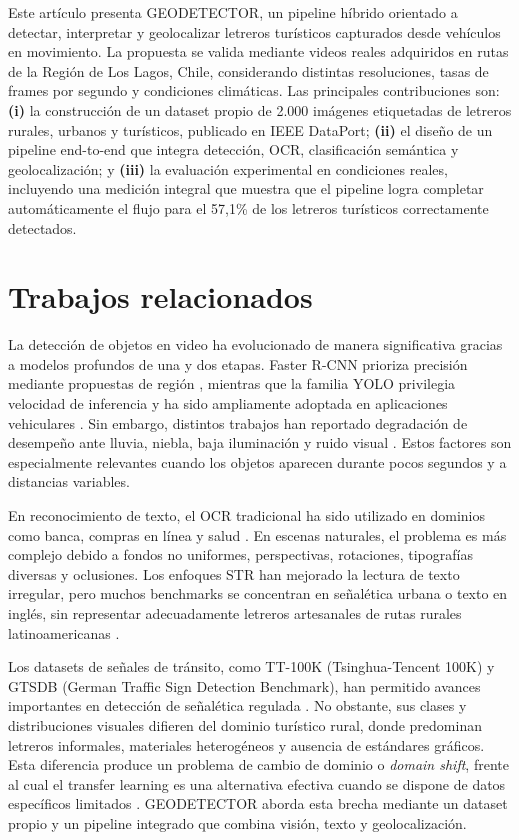 \documentclass[conference]{IEEEtran}
\begin{document}
Este artículo presenta GEODETECTOR, un pipeline híbrido orientado a 
detectar, interpretar y geolocalizar letreros turísticos capturados 
desde vehículos en movimiento. La propuesta se valida mediante videos 
reales adquiridos en rutas de la Región de Los Lagos, Chile, considerando
distintas resoluciones, tasas de frames por segundo y condiciones 
climáticas. Las principales contribuciones son: \textbf{(i)} la 
construcción de un dataset propio de 2.000 imágenes etiquetadas de 
letreros rurales, urbanos y turísticos, publicado en IEEE DataPort; 
\textbf{(ii)} el diseño de un pipeline end-to-end que integra detección, 
OCR, clasificación semántica y geolocalización; y \textbf{(iii)} la evaluación 
experimental en condiciones reales, incluyendo una medición integral 
que muestra que el pipeline logra completar automáticamente el flujo 
para el 57,1\% de los letreros turísticos correctamente detectados.

\section{Trabajos relacionados}

La detección de objetos en video ha evolucionado de manera significativa 
gracias a modelos profundos de una y dos etapas. Faster R-CNN prioriza
precisión mediante propuestas de región \cite{rnn-faster}, mientras que 
la familia YOLO privilegia velocidad de inferencia y ha sido ampliamente 
adoptada en aplicaciones vehiculares \cite{comparacion-yolo-rnn,yolo-vehiculos}. 
Sin embargo, distintos trabajos han reportado degradación de desempeño 
ante lluvia, niebla, baja iluminación y ruido visual 
\cite{yolo-escenarios-naturales}. Estos factores son especialmente 
relevantes cuando los objetos aparecen durante pocos segundos y a 
distancias variables.

En reconocimiento de texto, el OCR tradicional ha sido utilizado en 
dominios como banca, compras en línea y salud \cite{ocr-banco,ocr-compras-en-linea,ocr-salud}. 
En escenas naturales, el problema es más complejo debido a fondos no 
uniformes, perspectivas, rotaciones, tipografías diversas y oclusiones. 
Los enfoques STR han mejorado la lectura de texto irregular, pero muchos 
benchmarks se concentran en señalética urbana o texto en inglés, sin 
representar adecuadamente letreros artesanales de rutas rurales 
latinoamericanas \cite{icdar,ocr-curvo}.

Los datasets de señales de tránsito, como TT-100K (Tsinghua-Tencent 100K) y
GTSDB (German Traffic Sign Detection Benchmark), han permitido 
avances importantes en detección de señalética regulada 
\cite{TT100K-Dataset,gtsdb-dataset}. No obstante, sus clases y 
distribuciones visuales difieren del dominio turístico rural, donde 
predominan letreros informales, materiales heterogéneos y ausencia de 
estándares gráficos. Esta diferencia produce un problema de cambio de 
dominio o \textit{domain shift}, frente al cual el transfer learning es 
una alternativa efectiva cuando se dispone de datos específicos limitados 
\cite{domain-shift,transfer-learning,transfer-learning-yolo}. GEODETECTOR 
aborda esta brecha mediante un dataset propio y un pipeline integrado que 
combina visión, texto y geolocalización.
\end{document}
